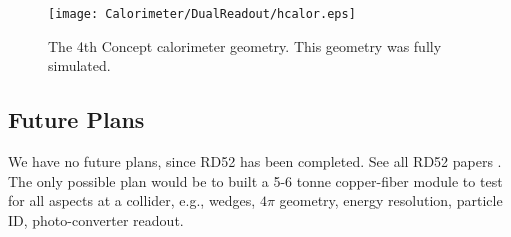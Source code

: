  
\begin{figure}
 \texttt{[image: Calorimeter/DualReadout/hcalor.eps]}
 \label{fig:hcalor}
 \caption{The 4th Concept \cite{4th} calorimeter geometry.   This geometry was fully simulated. }
\end{figure}

\subsection{Future Plans}

We have no future plans, since RD52 has been completed.  See all RD52 papers \cite{dream}. The only possible plan would be to built a 5-6 tonne copper-fiber module to test for all aspects at a collider, e.g., wedges, $4 \pi$ geometry, energy resolution, particle ID, photo-converter readout.  
